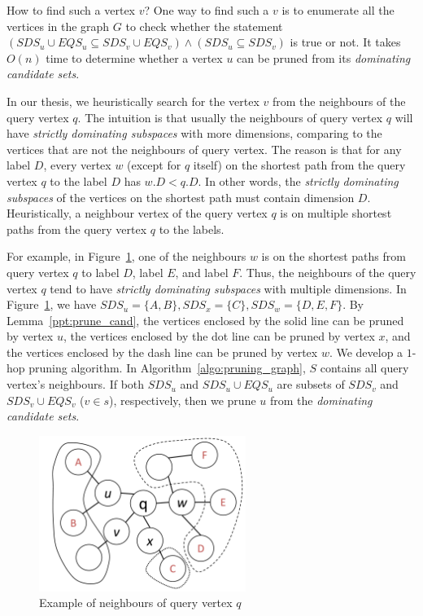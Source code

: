 How to find such a vertex $v$? One way to find such a $v$ is to enumerate all the vertices in the graph $G$ to check whether the statement $(SDS_u \cup EQS_u \subseteq SDS_v \cup EQS_v) \wedge (SDS_u \subseteq SDS_v)$ is true or not. It takes $O(n)$ time to determine whether a vertex $u$ can be pruned from its \emph{dominating candidate sets}.

In our thesis, we heuristically search for the vertex $v$ from the neighbours of the query vertex $q$. The intuition is that usually the neighbours of query vertex $q$ will have \emph{strictly dominating subspaces} with more dimensions, comparing to the vertices that are not the neighbours of query vertex. The reason is that for any label $D$, every vertex $w$ (except for $q$ itself) on the shortest path from the query vertex $q$ to the label $D$ has $w.D < q.D$. In other words, the \emph{strictly dominating subspaces} of the vertices on the shortest path must contain dimension $D$. Heuristically, a neighbour vertex of the query vertex $q$ is on multiple shortest paths from the query vertex $q$ to the labels.

For example, in Figure~\ref{fig:heuristic}, one of the neighbours $w$ is on the shortest paths from query vertex $q$ to label $D$, label $E$, and label $F$.
Thus, the neighbours of the query vertex $q$ tend to have \emph{strictly dominating subspaces} with multiple dimensions. In Figure~\ref{fig:heuristic}, we have $SDS_u=\{A, B\}, SDS_x=\{C\}, SDS_w=\{D, E, F\}$.
By Lemma~\ref{ppt:prune_cand}, the vertices enclosed by the solid line can be pruned by vertex $u$, the vertices enclosed by the dot line can be pruned by vertex $x$, and the vertices enclosed by the dash line can be pruned by vertex $w$.
We develop a $1$-hop pruning algorithm. In Algorithm~\ref{algo:pruning_graph}, $S$ contains all query vertex's neighbours. If both $SDS_u$ and $SDS_u \cup EQS_u$ are subsets of $SDS_v$ and $SDS_v \cup EQS_v$ ($v \in s$), respectively, then we prune $u$ from the \emph{dominating candidate sets}.


\begin{figure}[H]
    \centering
    \includegraphics[width=0.6\textwidth]{figs/heuristic}
    \caption{Example of neighbours of query vertex $q$}
    \label{fig:heuristic}
\end{figure}

